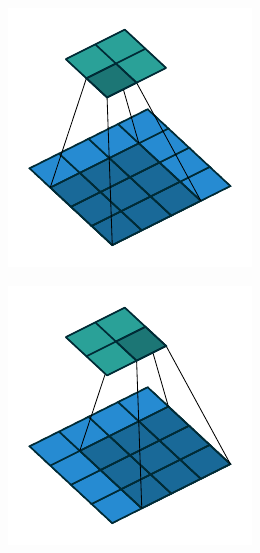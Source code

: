 \begin{figure}[H]
\begin{subfigure}{0.22\linewidth}
    \end{subfigure}\hfill%
    \begin{subfigure}{0.22\linewidth}
        \centering
        \includegraphics[width=\linewidth]{figures/convolutions/no_padding_no_strides_02.pdf}
    \end{subfigure}\hfill%
    \begin{subfigure}{0.22\linewidth}
        \centering
        \includegraphics[width=\linewidth]{figures/convolutions/no_padding_no_strides_03.pdf}

\end{subfigure}
\end{figure}
